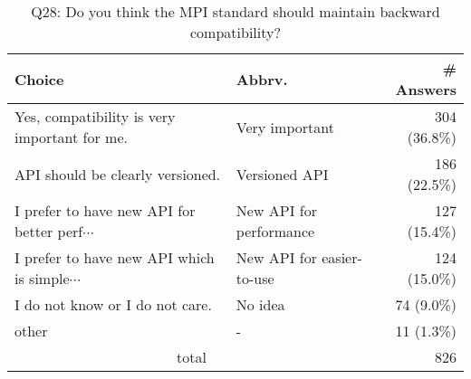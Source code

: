 \begin{table}[htb]%
\begin{center}%
\caption{Q28: Do you think the MPI standard should maintain backward compatibility?}%
\label{tab:Q28-ans}%
\begin{tabular}{l|l|r}%
\hline%
Choice & Abbrv. & \# Answers \\%
\hline%
{\small Yes, compatibility is very important for me.} & Very important & 304 (36.8\%) \\%
API should be clearly versioned. & Versioned API & 186 (22.5\%) \\%
{\small I prefer to have new API for better perf$\cdots$} & New API for performance & 127 (15.4\%) \\%
{\small I prefer to have new API which is simple$\cdots$} & New API for easier-to-use & 124 (15.0\%) \\%
I do not know or I do not care. & No idea & 74 (9.0\%) \\%
other & - & 11 (1.3\%) \\%
\hline%
\multicolumn{2}{c}{total} & 826 \\%
\hline%
\end{tabular}%
\end{center}%
\end{table}%
